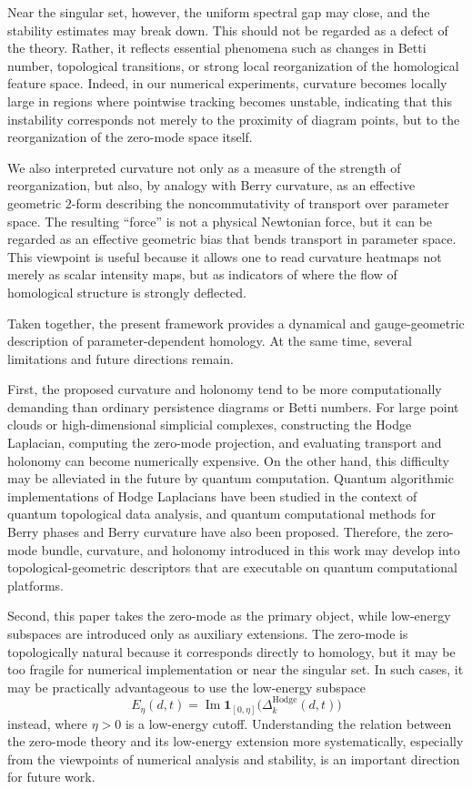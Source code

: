 \documentclass[pdflatex,sn-mathphys-num]{sn-jnl}%
\theoremstyle{thmstyleone}%
\theoremstyle{thmstyletwo}%
\theoremstyle{thmstylethree}%
\begin{document}
Near the singular set, however, the uniform spectral gap may close, and the stability estimates may break down. This should not be regarded as a defect of the theory. Rather, it reflects essential phenomena such as changes in Betti number, topological transitions, or strong local reorganization of the homological feature space. Indeed, in our numerical experiments, curvature becomes locally large in regions where pointwise tracking becomes unstable, indicating that this instability corresponds not merely to the proximity of diagram points, but to the reorganization of the zero-mode space itself.

We also interpreted curvature not only as a measure of the strength of reorganization, but also, by analogy with Berry curvature, as an effective geometric \(2\)-form describing the noncommutativity of transport over parameter space. The resulting ``force'' is not a physical Newtonian force, but it can be regarded as an effective geometric bias that bends transport in parameter space. This viewpoint is useful because it allows one to read curvature heatmaps not merely as scalar intensity maps, but as indicators of where the flow of homological structure is strongly deflected.

Taken together, the present framework provides a dynamical and gauge-geometric description of parameter-dependent homology. At the same time, several limitations and future directions remain.

First, the proposed curvature and holonomy tend to be more computationally demanding than ordinary persistence diagrams or Betti numbers. For large point clouds or high-dimensional simplicial complexes, constructing the Hodge Laplacian, computing the zero-mode projection, and evaluating transport and holonomy can become numerically expensive. On the other hand, this difficulty may be alleviated in the future by quantum computation. Quantum algorithmic implementations of Hodge Laplacians have been studied in the context of quantum topological data analysis\cite{lloyd2016quantum,akhalwaya2024comparing,gyurik2022towards,yamauchi2025quantum}, and quantum computational methods for Berry phases and Berry curvature have also been proposed\cite{hayakawa2025computational,mootz2026efficient}. Therefore, the zero-mode bundle, curvature, and holonomy introduced in this work may develop into topological-geometric descriptors that are executable on quantum computational platforms.

Second, this paper takes the zero-mode as the primary object, while low-energy subspaces are introduced only as auxiliary extensions. The zero-mode is topologically natural because it corresponds directly to homology, but it may be too fragile for numerical implementation or near the singular set. In such cases, it may be practically advantageous to use the low-energy subspace
\[
E_\eta(d,t)
=
\operatorname{Im}\mathbf 1_{[0,\eta]}
\bigl(\Delta^{\mathrm{Hodge}}_{k}(d,t)\bigr)
\]
instead, where \(\eta>0\) is a low-energy cutoff. Understanding the relation between the zero-mode theory and its low-energy extension more systematically, especially from the viewpoints of numerical analysis and stability, is an important direction for future work.
\end{document}
